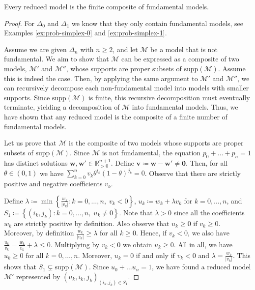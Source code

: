 \begin{proposition}\label{prop:composition-fundamental}
    Every reduced model is the finite composite of fundamental models.
\end{proposition}

\begin{proof}
    For \( \Delta_0 \) and \( \Delta_1 \) we know that they only contain fundamental models, see Examples \ref{ex:prob-simplex-0} and \ref{ex:prob-simplex-1}. 
    
    Assume we are given \( \Delta_n \) with \( n \geq 2 \), and let \( \mathcal{M} \) be a model that is not fundamental. We aim to show that \( \mathcal{M} \) can be expressed as a composite of two models, \( \mathcal{M}' \) and \( \mathcal{M}'' \), whose supports are proper subsets of \( \mathrm{supp}(\mathcal{M}) \). Assume this is indeed the case. Then, by applying the same argument to \( \mathcal{M}' \) and \( \mathcal{M}'' \), we can recursively decompose each non-fundamental model into models with smaller supports. Since \( \mathrm{supp}(\mathcal{M}) \) is finite, this recursive decomposition must eventually terminate, yielding a decomposition of \( \mathcal{M} \) into fundamental models. Thus, we have shown that any reduced model is the composite of a finite number of fundamental models. 

    Let us prove that \( \mathcal{M} \) is the composite of two models whose supports are proper subsets of \( \mathrm{supp}(\mathcal{M}) \). Since \( \mathcal{M} \) is not fundamental, the equation \( p_0 + \dots + p_n = 1 \) has distinct solutions \( \mathbf w, \mathbf w' \in \mathbb{R}^{n+1}_{> 0} \). Define \( \mathbf v \coloneqq \mathbf w - \mathbf w' \neq \mathbf 0 \). Then, for all \( \theta \in (0,1) \) we have \( \sum_{k=0}^n v_k \theta^{i_k}(1-\theta)^{j_k} = 0  \).
    Observe that there are strictly positive and negative coefficients \( v_k \). 
    
    Define \( \lambda \coloneqq \min \left\{ \frac{w_k}{\lvert v_k \rvert} : k = 0, \dots, n, \; v_k < 0 \right\} \), \( u_k \coloneqq w_k + \lambda v_k \) for \(k = 0, \dots, n \), and \( S_1 \coloneqq \left\{ (i_k, j_k) : k=0, \dots, n, \; u_k \neq 0 \right\} \). Note that \( \lambda > 0 \) since all the coefficients \( w_k \) are strictly positive by definition. Also observe that \( u_k \geq 0 \) if \( v_k \geq 0 \). Moreover, by definition \( \frac{w_k}{\lvert v_k \rvert} \geq \lambda \) for all \( k \geq 0 \). Hence, if \( v_k < 0 \), we also have \( \frac{u_k}{v_k} = \frac{w_k}{v_k} + \lambda  \leq 0\). Multiplying by \( v_k < 0 \) we obtain \( u_k \geq 0 \). All in all, we have \( u_k \geq 0 \) for all \( k = 0, \dots, n \). Moreover, \( u_k = 0 \) if and only if \( v_k < 0 \) and \( \lambda = \frac{w_k}{\lvert v_k \rvert} \). This shows that \( S_1 \subsetneq \mathrm{supp}(\mathcal{M}) \). Since \( u_0 + \dots u_n = 1 \), we have found a reduced model \( \mathcal{M}' \) represented by \( (u_k, i_k, j_k)_{(i_k,j_k) \in S_1} \).


\end{proof}
